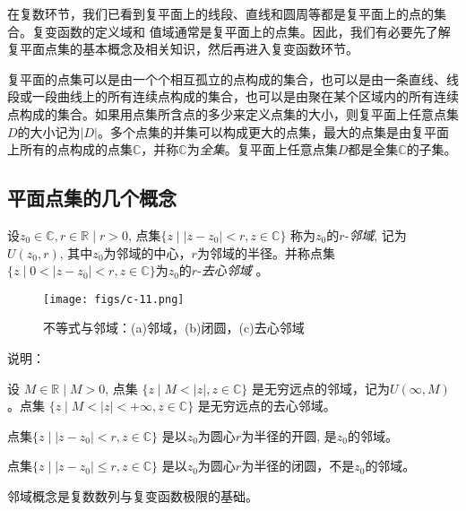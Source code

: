 在复数环节，我们已看到复平面上的线段、直线和圆周等都是复平面上的点的集合。复变函数的定义域和
值域通常是复平面上的点集。因此，我们有必要先了解复平面点集的基本概念及相关知识，然后再进入复变函数环节。

复平面的点集可以是由一个个相互孤立的点构成的集合，也可以是由一条直线、线段或一段曲线上的所有连续点构成的集合，也可以是由聚在某个区域内的所有连续点构成的集合。如果用点集所含点的多少来定义点集的大小，则复平面上任意点集$D$的大小记为$|D|$。多个点集的并集可以构成更大的点集，最大的点集是由复平面上所有的点构成的点集$\mathbb{C}$，并称$\mathbb{C}$为\emph{全集}。复平面上任意点集$D$都是全集$\mathbb{C}$的子集。

\subsection{平面点集的几个概念}

\begin{definition}\label{}\index{}
    设$z_0 \in \mathbb{C},  r  \in \mathbb{R} \mid  r  > 0$, 点集$\{z \mid \left\vert z - z_0 \right\vert <  r , z \in \mathbb{C} \}$ 称为$z_0$的$ r $-\emph{邻域}, 记为$U(z_0,  r )$, 其中$z_0$为邻域的中心，$ r $为邻域的半径。并称点集$\{z \mid 0 < \left\vert z - z_0 \right\vert <  r , z \in \mathbb{C} \}$为$z_0$的$ r $-\emph{去心邻域} 。
    \begin{figure}[htbp]
      \centering
      \texttt{[image: figs/c-11.png]}
      \caption{不等式与邻域：(a)邻域，(b)闭圆，(c)去心邻域 }
    \end{figure} 
\end{definition}
说明：
\begin{compactitem}
    \item 设 $M \in \mathbb{R} \mid M > 0$, 点集 $\{z \mid M<\left\vert z\right\vert  , z \in \mathbb{C} \}$ 是无穷远点的邻域，记为$U(\infty, M)$。点集 $\{z \mid M<\left\vert z\right\vert < + \infty , z \in \mathbb{C} \}$ 是无穷远点的去心邻域。
    \item 点集$\{z \mid \left\vert z - z_0 \right\vert <  r , z \in \mathbb{C} \}$ 是以$z_0$为圆心$ r $为半径的开圆, 是$z_0$的邻域。
    \item 点集$\{z \mid \left\vert z - z_0 \right\vert \le  r , z \in \mathbb{C} \}$ 是以$z_0$为圆心$ r $为半径的闭圆，不是$z_0$的邻域。
    \item 邻域概念是复数数列与复变函数极限的基础。
\end{compactitem}

